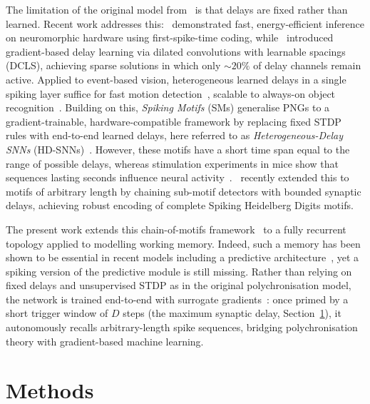 \documentclass{scrartcl}
\newcommand{\citep}[1]{\parencite{#1}}
\newcommand{\citet}[1]{\textcite{#1}}
\begin{document}
The limitation of the original model from~\citet{Izhikevich2006} is that delays are fixed rather than learned. Recent work addresses this:~\citet{Goltz2021} demonstrated fast, energy-efficient inference on neuromorphic hardware using first-spike-time coding, while~\citet{Hammouamri2023} introduced gradient-based delay learning via dilated convolutions with learnable spacings (DCLS), achieving sparse solutions in which only $\sim\!20\%$ of delay channels remain active. Applied to event-based vision, heterogeneous learned delays in a single spiking layer suffice for fast motion detection~\citep{Grimaldi2023a}, scalable to always-on object recognition~\citep{Grimaldi2024}. Building on this, \emph{Spiking Motifs} (SMs) generalise PNGs to a gradient-trainable, hardware-compatible framework by replacing fixed STDP rules with end-to-end learned delays, here referred to as \emph{Heterogeneous-Delay SNNs} (HD-SNNs)~\citep{Perrinet2023}. However, these motifs have a short time span equal to the range of possible delays, whereas stimulation experiments in mice show that sequences lasting seconds influence neural activity~\citep{Deveau2026}.~\citet{Kronland-Martinet2026} recently extended this to motifs of arbitrary length by chaining sub-motif detectors with bounded synaptic delays, achieving robust encoding of complete Spiking Heidelberg Digits motifs.

The present work extends this chain-of-motifs framework~\citep{Kronland-Martinet2026} to a fully recurrent topology applied to modelling working memory. Indeed, such a memory has been shown to be essential in recent models including a predictive architecture~\citep{Dawid2023}, yet a spiking version of the predictive module is still missing. Rather than relying on fixed delays and unsupervised STDP as in the original polychronisation model, the network is trained end-to-end with surrogate gradients~\citep{Neftci2019a}: once primed by a short trigger window of $D$ steps (the maximum synaptic delay, Section~\ref{sec:methods}), it autonomously recalls arbitrary-length spike sequences, bridging polychronisation theory with gradient-based machine learning.

\section{Methods}
\label{sec:methods}
\end{document}
